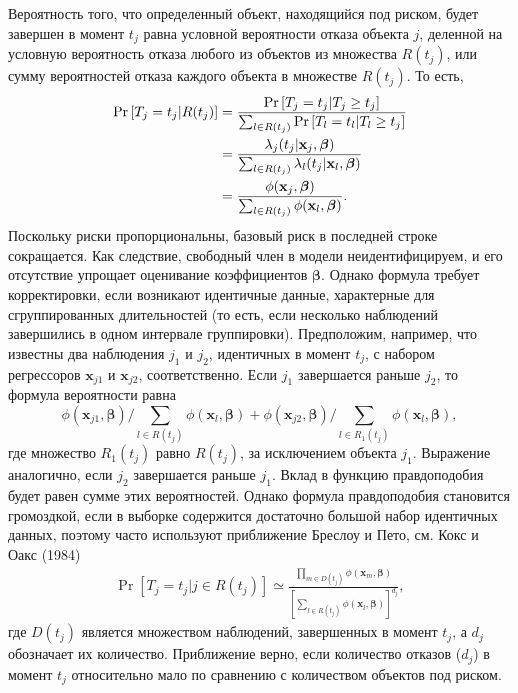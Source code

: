 Вероятность того, что определенный объект, находящийся под риском, будет завершен в момент $t_j$ равна условной вероятности отказа объекта $j$, деленной на условную вероятность отказа любого из объектов из множества $R(t_j)$, или сумму вероятностей отказа каждого объекта в множестве $R(t_j)$. То есть,
        \begin{align}
        \mathrm{Pr}\left[T_j=t_j|R(t_j)\right]&=\frac{\mathrm{Pr}\left[T_j=t_j|T_j\ge t_j\right]}{\sum_{l\in R(t_j)}\mathrm{Pr}\left[T_l=t_l|T_l\ge t_j\right]}\notag\\
        &=\frac{\lambda_j(t_j|\mathbf{x}_j,\bm{\beta})}{\sum_{l\in R(t_j)}\lambda_l(t_j|\mathbf{x}_l,\bm{\beta})}\notag\\
        &=\frac{\phi(\mathbf{x}_j,\bm{\beta})}{\sum_{l\in R(t_j)}\phi(\mathbf{x}_l,\bm{\beta})}. \notag
        \end{align}
Поскольку риски пропорциональны, базовый риск в последней строке сокращается. Как следствие, свободный член в модели неидентифицируем, и его отсутствие упрощает оценивание коэффициентов $\bm{\beta}$. Однако формула требует корректировки, если возникают идентичные данные, характерные для сгруппированных длительностей (то есть, если несколько наблюдений завершились в одном интервале группировки). Предположим, например, что известны два наблюдения $j_1$ и $j_2$, идентичных в момент $t_j$, с набором регрессоров $\mathbf{x}_{j1}$ и $\mathbf{x}_{j2}$, соответственно. Если $j_1$ завершается раньше $j_2$, то формула вероятности равна
        $$\phi(\mathbf{x}_{j1},\bm{\beta})/\sum_{l\in R(t_j)}\phi(\mathbf{x}_l,\bm{\beta})+\phi(\mathbf{x}_{j2},\bm{\beta})/\sum_{l\in R_1(t_j)}\phi(\mathbf{x}_l,\bm{\beta}),$$
где множество $R_1(t_j)$ равно $R(t_j)$, за исключением объекта $j_1$. Выражение аналогично, если $j_2$ завершается раньше $j_1$. Вклад в функцию правдоподобия будет равен сумме этих вероятностей. Однако формула правдоподобия становится громоздкой, если в выборке содержится достаточно большой набор идентичных данных, поэтому часто используют приближение Бреслоу и Пето, см. Кокс и Оакс (1984)
        \begin{align}
        \label{eq:17.31}
        \Pr\left[T_j=t_j|j\in R(t_j)\right]\simeq\frac{\prod_{m\in D(t_j)}\phi(\mathbf{x}_m,\bm{\beta})}{\left[\sum_{l\in R(t_j)} \phi(\mathbf{x}_l,\bm{\beta})\right]^{d_j}},
        \end{align}
где $D(t_j)$ является множеством наблюдений, завершенных в момент $t_j$, а $d_j$ обозначает их количество. Приближение верно, если количество отказов ($d_j$) в момент $t_j$ относительно мало по сравнению с количеством объектов под риском.

